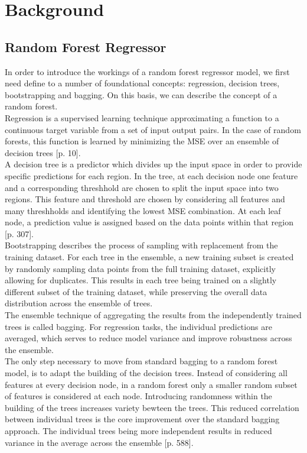 \chapter{Background}\label{chap:background}




\section{Random Forest Regressor}

In order to introduce the workings of a random forest regressor model, we first need define to a number of foundational concepts: regression, decision trees, bootstrapping and bagging. On this basis, we can describe the concept of a random forest. \\
Regression is a supervised learning technique approximating a function to a continuous target variable from a set of input output pairs. In the case of random forests, this function is learned by minimizing the MSE over an ensemble of decision trees \citep{hastie_elements_2009}[p. 10]. \\
A decision tree is a predictor which divides up the input space in order to provide specific predictions for each region. In the tree, at each decision node one feature and a corresponding threshhold are chosen to split the input space into two regions. This feature and threshold are chosen by considering all features and many threshholds and identifying the lowest MSE combination. At each leaf node, a prediction value is assigned based on the data points within that region \citep{hastie_elements_2009}[p. 307]. \\
Bootstrapping describes the process of sampling with replacement from the training dataset. For each tree in the ensemble, a new training subset is created by randomly sampling data points from the full training dataset, explicitly allowing for duplicates. This results in each tree being trained on a slightly different subset of the training dataset, while preserving the overall data distribution across the ensemble of trees. \\
The ensemble technique of aggregating the results from the independently trained trees is called bagging. For regression tasks, the individual predictions are averaged, which serves to reduce model variance and improve robustness across the ensemble. \\
The only step necessary to move from standard bagging to a random forest model, is to adapt the building of the decision trees. Instead of considering all features at every decision node, in a random forest only a smaller random subset of features is considered at each node. Introducing randomness within the building of the trees increases variety bewteen the trees. This reduced correlation between individual trees is the core improvement over the standard bagging approach. The individual trees being more independent results in reduced variance in the average across the ensemble \citep{hastie_elements_2009}[p. 588]. \\
